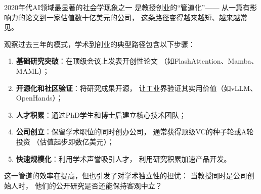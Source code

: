 2020年代AI领域最显著的社会学现象之一
是教授创业的``管道化''——
从一篇有影响力的论文到一家估值数十亿美元的公司，
这条路径变得越来越短、越来越常见。

\begin{corebox}[教授-创业管道的典型路径]
观察过去三年的模式，学术到创业的典型路径包含以下步骤：
\begin{enumerate}[noitemsep]
  \item \textbf{基础研究突破}：在顶级会议上发表开创性论文
        （如FlashAttention、Mamba、MAML）；
  \item \textbf{开源化和社区验证}：将研究成果开源，
        让工业界验证其实用价值（如vLLM、OpenHands）；
  \item \textbf{人才积累}：通过PhD学生和博士后建立核心技术团队；
  \item \textbf{公司创立}：保留学术职位的同时创办公司，
        通常获得顶级VC的种子轮或A轮投资
        （估值起步即数亿美元）；
  \item \textbf{快速规模化}：利用学术声誉吸引人才，
        利用研究积累加速产品开发。
\end{enumerate}
这一管道的效率在提高，但也引发了对学术独立性的担忧：
当教授同时是公司创始人时，
他们的公开研究是否还能保持客观中立？
\end{corebox}

